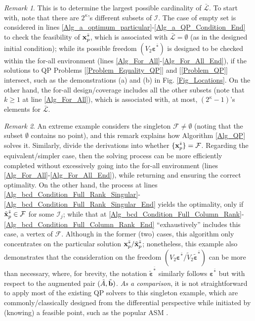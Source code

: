 \documentclass[9pt,twocolumn,twoside,lineno]{pnas-new-1}
\newcommand{\bfb}{{\bf b}}
\newcommand{\bfx}{{\bf x}}
\newcommand{\bfvarepsilon}{{\boldsymbol \varepsilon}}
\newcommand{\calF}{{\mathcal F}}
\newcommand{\calI}{{\mathcal I}}
\newcommand{\calL}{{\mathcal L}}
\theoremstyle{remark}
\newtheorem{remark}{Remark}[section]
\begin{document}
\begin{remark}
This is to determine the largest possible cardinality of $\bar\calL$. To start with, note that there are $2^\kappa$'s different subsets of $\calI$. The case of empty set is considered in lines \ref{Alg_a_optimum_particular}-\ref{Alg_a_QP_Condition_End} to check the feasibility of $\bfx_p^{\bar *}$, which is associated with $\bar\calL=\emptyset$ (as in the designed initial condition); while its possible freedom $(V_2\bfvarepsilon^{\bar *})$ is designed to be checked within the for-all environment (lines \ref{Alg_For_All}-\ref{Alg_For_All_End}), if the solutions to QP Problems [\ref{Problem_Equality_QP}] and [\ref{Problem_QP}] intersect, such as the demonstrations (a) and (b) in Fig. \ref{Fig_Locations}. On the other hand, the for-all design/coverage includes all the other subsets (note that $k\ge 1$ at line \ref{Alg_For_All}), which is associated with, at most, $(2^\kappa-1)$'s elements for $\bar\calL$.
\label{Rem_Candidates_Cardinality}
\end{remark}

\begin{remark}
An extreme example considers the singleton $\calF\ne\emptyset$ (noting that the subset $\emptyset$ contains no point), and this remark explains how Algorithm \ref{Alg_QP} solves it. Similarly, divide the derivations into whether $\{\bfx_p^{\bar *}\}=\calF$. Regarding the equivalent/simpler case, then the solving process can be more efficiently completed without excessively going into the for-all environment (lines \ref{Alg_For_All}-\ref{Alg_For_All_End}), while returning and ensuring the correct optimality. On the other hand, the process at lines \ref{Alg_bcd_Condition_Full_Rank_Singular}-\ref{Alg_bcd_Condition_Full_Rank_Singular_End} yields the optimality, only if $\tilde\bfx_p^{\bar *}\in\calF$ for some $\calI_j$; while that at \ref{Alg_bcd_Condition_Full_Column_Rank}-\ref{Alg_bcd_Condition_Full_Column_Rank_End} ``exhaustively'' includes this case, a vertex of $\calF$. Although in the former (two) cases, this algorithm only concentrates on the particular solution $\bfx_p^{\bar *}/\tilde\bfx_p^{\bar *}$; nonetheless, this example also demonstrates that the consideration on the freedom $(V_2\bfvarepsilon^{\bar *}/\tilde V_2\tilde\bfvarepsilon^{\bar *})$ can be more than necessary, where, for brevity, the notation $\tilde\bfvarepsilon^{\bar *}$ similarly follows $\bfvarepsilon^{\bar *}$ but with respect to the augmented pair $(\tilde A,\tilde\bfb)$. \textit{As a comparison}, it is not straightforward to apply most of the existing QP solvers \citep{BoVa:04,NoWr:06} to this singleton example, which are commonly/classically designed from the differential perspective while initiated by (knowing) a feasible point, such as the popular ASM \citep{Lu(Ye):03(16)}.
\label{Rem_QP_Singleton_F}
\end{remark}
\end{document}
